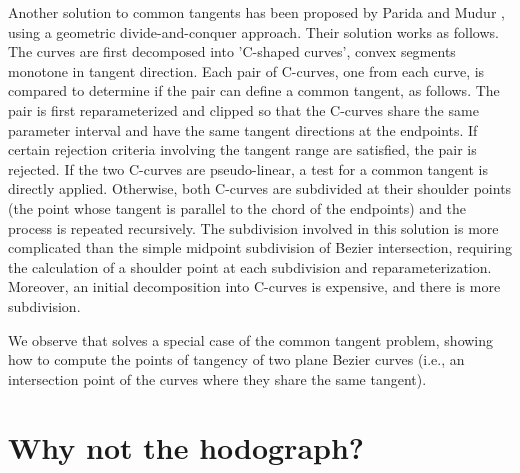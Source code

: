 \documentclass[9pt,twocolumn]{article}
\begin{document}

Another solution to common tangents has been proposed by 
Parida and Mudur \cite{parida95}, using a geometric divide-and-conquer approach.
Their solution works as follows.
The curves are first decomposed into 'C-shaped curves', convex segments
monotone in tangent direction.
Each pair of C-curves, one from each curve, is compared to determine
if the pair can define a common tangent, as follows.
The pair is first reparameterized and clipped so that the C-curves
share the same parameter interval and have the same tangent directions at the endpoints. 
If certain rejection criteria involving the tangent range are satisfied,
the pair is rejected.
If the two C-curves are pseudo-linear, a test for a common tangent is
directly applied.
Otherwise, both C-curves are subdivided at their shoulder points (the point
whose tangent is parallel to the chord of the endpoints) and the process
is repeated recursively.
The subdivision involved in this solution is more complicated than the
simple midpoint subdivision of Bezier intersection,
requiring the calculation of a shoulder point at each subdivision
and reparameterization.
Moreover, an initial decomposition into C-curves is expensive, and 
there is more subdivision.


We observe that \cite{sederberg90} solves a special case of the common
tangent problem, showing how to compute the points of tangency of two plane Bezier curves
(i.e., an intersection point of the curves where they share the same tangent).

\section{Why not the hodograph?}
\label{sec:hodo}
\end{document}
